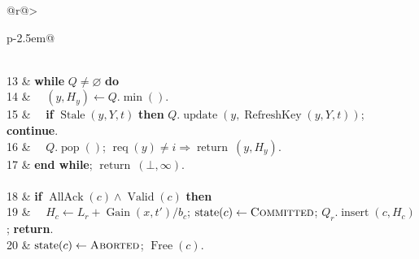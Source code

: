 \begin{algorithm}[t]
\begin{tabular}{@{}r@{\hspace{0.5em}}>{\raggedright\arraybackslash}p{\dimexpr\columnwidth-2.5em\relax}@{}}
\\
13 & \textbf{while} $Q\ne\varnothing$ \textbf{do}\\
14 & $\quad(y,H_y)\gets Q.\operatorname{min}()$.\\
15 & $\quad$\textbf{if} $\operatorname{Stale}(y,Y,t)$ \textbf{then} $Q.\operatorname{update}(y,\operatorname{RefreshKey}(y,Y,t))$; \textbf{continue}.\\
16 & $\quad Q.\operatorname{pop}()$; $\operatorname{req}(y)\ne i\Rightarrow\operatorname{return}\ (y,H_y)$.\\
17 & \textbf{end while}; $\operatorname{return}\ (\bot,\infty)$.\\
\\
18 & \textbf{if} $\operatorname{AllAck}(c)\land\operatorname{Valid}(c)$ \textbf{then}\\
19 & $\quad H_c\gets L_r+\operatorname{Gain}(x,t')/b_c$; $\operatorname{state}(c)\gets\textsc{Committed}$; $Q_r.\operatorname{insert}(c,H_c)$; \textbf{return}.\\
20 & $\operatorname{state}(c)\gets\textsc{Aborted}$; $\operatorname{Free}(c)$.\\
\end{tabular}
\end{algorithm}
